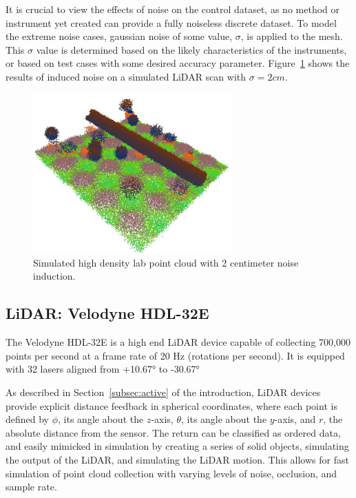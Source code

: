 \documentclass[12pt]{drexelthesis}
\let\Oldsubsection\subsection
\renewcommand{\subsection}{\FloatBarrier\Oldsubsection}
\begin{document}
It is crucial to view the effects of noise on the control dataset, as no method or instrument yet created can provide a fully noiseless discrete dataset. To model the extreme noise cases, gaussian noise of some value, $\sigma$, is applied to the mesh. This $\sigma$ value is determined based on the likely characteristics of the instruments, or based on test cases with some desired accuracy parameter. Figure~\ref{technical:2cmdense} shows the results of induced noise on a simulated LiDAR scan with $\sigma = 2 cm$.

\begin{figure}[!ht]
	\centering
	\includegraphics[width=3in]{simulated-lab-scan/2cmnoise/rawcloud.JPG}
	\caption[Simulated high density lab point cloud with 2cm noise induction]{\centering Simulated high density lab point cloud with 2 centimeter noise induction.}
	\label{technical:2cmdense}
\end{figure}

\subsection{LiDAR: Velodyne HDL-32E}
The Velodyne HDL-32E is a high end LiDAR device capable of collecting 700,000 points per second at a frame rate of 20 Hz (rotations per second). It is equipped with 32 lasers aligned from +\ang{10.67} to -\ang{30.67}

As described in Section~\ref{subsec:active} of the introduction, LiDAR devices provide explicit distance feedback in spherical coordinates, where each point is defined by $\phi$, its angle about the $z$-axis, $\theta$, its angle about the $y$-axis, and $r$, the absolute distance from the sensor. The return can be classified as ordered data, and easily mimicked in simulation by creating a series of solid objects, simulating the output of the LiDAR, and simulating the LiDAR motion. This allows for fast simulation of point cloud collection with varying levels of noise, occlusion, and sample rate.
\end{document}
